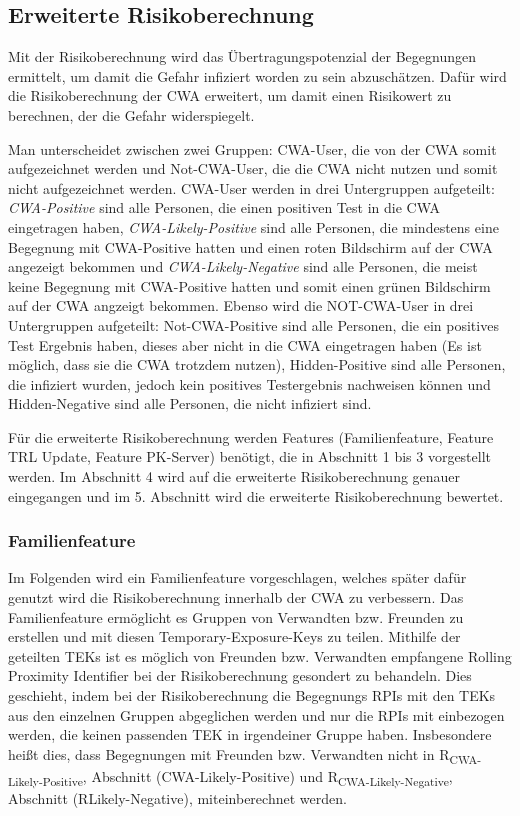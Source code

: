 \documentclass[conference]{IEEEtran}
\begin{document}
\subsection{Erweiterte Risikoberechnung}
Mit der Risikoberechnung wird das Übertragungspotenzial der Begegnungen ermittelt,
um damit die Gefahr infiziert worden zu sein abzuschätzen.
Dafür wird die Risikoberechnung der CWA erweitert, 
um damit einen Risikowert zu berechnen, der die Gefahr widerspiegelt.

Man unterscheidet zwischen zwei Gruppen: CWA-User, die von der CWA somit aufgezeichnet werden und Not-CWA-User, 
die die CWA nicht nutzen und somit nicht aufgezeichnet werden. 
CWA-User werden in drei Untergruppen aufgeteilt: 
\textit{CWA-Positive} sind alle Personen, die einen positiven Test in die CWA eingetragen haben,
\textit{CWA-Likely-Positive} sind alle Personen, die mindestens eine Begegnung mit CWA-Positive hatten und einen roten Bildschirm auf der CWA angezeigt bekommen und
\textit{CWA-Likely-Negative} sind alle Personen, die meist keine Begegnung mit CWA-Positive hatten und somit einen grünen Bildschirm auf der CWA angzeigt bekommen.
Ebenso wird die NOT-CWA-User in drei Untergruppen aufgeteilt: Not-CWA-Positive sind alle Personen, die ein positives Test Ergebnis haben, 
dieses aber nicht in die CWA eingetragen haben (Es ist möglich, dass sie die CWA trotzdem nutzen), Hidden-Positive sind alle Personen, die infiziert wurden, 
jedoch kein positives Testergebnis nachweisen können und Hidden-Negative sind alle Personen, die nicht infiziert sind.

Für die erweiterte Risikoberechnung werden Features (Familienfeature, Feature TRL Update, 
Feature PK-Server) benötigt, die in Abschnitt 1 bis 3 vorgestellt werden.
Im Abschnitt 4 wird auf die erweiterte Risikoberechnung genauer eingegangen und im 5. Abschnitt wird die erweiterte Risikoberechnung bewertet.
\\
\subsubsection{Familienfeature}
\label{Familienfeature}
Im Folgenden wird ein Familienfeature vorgeschlagen, welches später dafür genutzt wird die Risikoberechnung innerhalb der CWA zu verbessern.
Das Familienfeature ermöglicht es Gruppen von Verwandten bzw. Freunden zu erstellen und mit diesen Temporary-Exposure-Keys zu teilen.
Mithilfe der geteilten TEKs ist es möglich von Freunden bzw. Verwandten empfangene Rolling Proximity Identifier bei der Risikoberechnung gesondert zu behandeln.
Dies geschieht, indem bei der Risikoberechnung die Begegnungs RPIs mit den TEKs aus den einzelnen Gruppen abgeglichen werden und nur die RPIs mit einbezogen werden, die keinen passenden TEK in irgendeiner Gruppe haben.
Insbesondere heißt dies, dass Begegnungen mit Freunden bzw. Verwandten nicht in R\textsubscript{CWA-Likely-Positive}, Abschnitt (CWA-Likely-Positive) und R\textsubscript{CWA-Likely-Negative}, Abschnitt (RLikely-Negative), miteinberechnet werden. 
\end{document}

